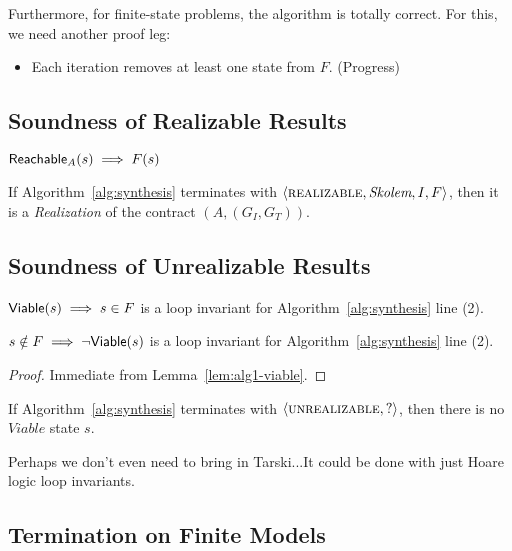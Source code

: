 Furthermore, for finite-state problems, the algorithm is totally correct.  For this, we need another proof leg:
\begin{itemize}
    \item Each iteration removes at least one state from $F$.  (Progress)
\end{itemize}


\subsection{Soundness of Realizable Results}


\begin{lemma} ${\mathsf {Reachable}}_A(s) \implies F(s)$
\end{lemma}

\begin{theorem} If Algorithm~\ref{alg:synthesis} terminates with $\langle \textsc{realizable}, \textit{Skolem}, I, F \rangle$, then it is a {\em Realization} of the contract $(A, (G_{I}, G_{T}))$.
\end{theorem}


\subsection{Soundness of Unrealizable Results}


\begin{lemma}
${\mathsf {Viable}}(s) \implies s \in F$ is a loop invariant for Algorithm~\ref{alg:synthesis} line (2).
\label{lem:alg1-viable}
\end{lemma}

\begin{corollary}
$s \notin F \implies \lnot {\mathsf {Viable}}(s)$ is a loop invariant for Algorithm~\ref{alg:synthesis} line (2).
\label{cor:alg1-nonviable}
\end{corollary}

\begin{proof}
Immediate from Lemma~\ref{lem:alg1-viable}.
\end{proof}

\begin{theorem} If Algorithm~\ref{alg:synthesis} terminates with $\langle \textsc{unrealizable}, ? \rangle$, then there is no $Viable$ state $s$.
\end{theorem}

Perhaps we don't even need to bring in Tarski...It could be done with just Hoare logic loop invariants.

\subsection{Termination on Finite Models}

